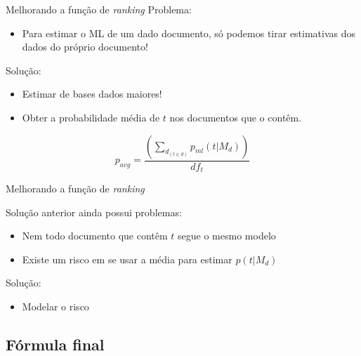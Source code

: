 \documentclass[compress]{beamer}
\begin{document}
    \begin{frame}{Melhorando a função de \emph{ranking}}
            Problema:

            \begin{itemize}
                \item Para estimar o ML de um dado documento, só podemos tirar estimativas
            dos dados do próprio documento!
            \end{itemize}

            Solução:

            \begin{itemize}
                \item Estimar de bases dados maiores!
                \item Obter a probabilidade média de $t$ nos documentos que o contêm.
            \end{itemize}
            \[
            p_{avg}=\frac{\left(\sum_{d_{(t\in d)}}p_{ml}(t|M_{d})\right)}{df_{t}}\]

    \end{frame}

    \begin{frame}{Melhorando a função de \emph{ranking}}

            Solução anterior ainda possui problemas:

            \begin{itemize}
                \item Nem todo documento que contêm $t$ segue o mesmo modelo
                \item Existe um risco em se usar a média para estimar $p(t|M_{d})$
            \end{itemize}

            Solução:

            \begin{itemize}
                \item Modelar o risco
            \end{itemize}
    \end{frame}

\subsection{Fórmula final}
\end{document}
